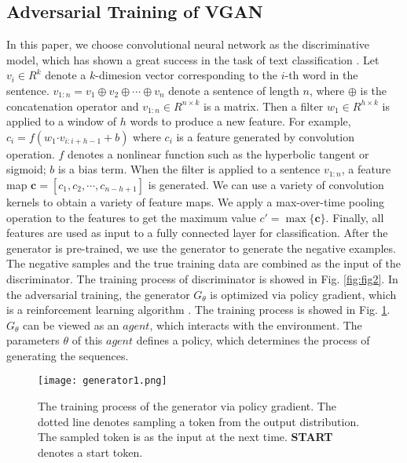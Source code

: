 \documentclass{llncs}
\begin{document}
\subsection{Adversarial Training of VGAN} 
	In this paper, we choose convolutional neural network as the discriminative model, which has shown a great success in the task of text classification \cite{kim2014convolutional}\cite{kalchbrenner2014a}.
Let $v_{i} \in R^{k} $ denote a $k$-dimesion vector corresponding to the $i$-th word in the sentence.  $v_{1:n}=v_{1} \oplus v_{2} \oplus \cdots \oplus v_{n}$   denote a sentence of length $n$, where $\oplus$ is the concatenation operator and $v_{1:n} \in R^{n \times k} $  is a matrix. Then a filter $w_{1}\in R^{h \times k}$ is applied to a window of $h$ words to produce a new feature. For example, $c_{i}=f(w_{1} \bm\cdot v_{i:i+h-1} + b )$
 where $c_{i}$ is a feature generated by convolution operation. $f$ denotes a nonlinear function such as the hyperbolic tangent or sigmoid; $ b$ is a bias term. When the filter is applied to a sentence $v_{1:n}$,  a feature map $\mathbf{c}=[c_{1},c_{2},\cdots,c_{n-h+1}]$  is generated. We can use a variety of convolution kernels to obtain a variety of feature maps. We apply a max-over-time pooling operation to the features to get the maximum value $c' = \max \{\mathbf{c}\}$. Finally, all features are used as input to a fully connected layer for classification.
 After the generator is pre-trained, we use the generator to generate the negative examples. The negative samples and the true training data are combined as the input of the discriminator. The training process of discriminator is showed in Fig. \ref{fig:fig2}.
In the adversarial training, the generator $G_{\theta}$ is optimized via  policy gradient, which is a reinforcement learning algorithm \cite{sutton2000policy} \cite{ranzato2016sequence}.  The training process is showed in Fig. \ref{fig:fig3}. $G_{\theta}$ can be viewed as an $agent$, which interacts with the environment. The parameters $\theta$ of this $agent$ defines a policy, which determines the process of generating the sequences. 
\begin{figure}[!t]
\centering
\centerline{\texttt{[image: generator1.png]}}
\caption{The training process of the generator via policy gradient. The dotted line denotes sampling a token from the output distribution. The sampled token is as the input at the next time. \textbf{START} denotes a start token.}
\label{fig:fig3}
\end{figure}
\end{document}

